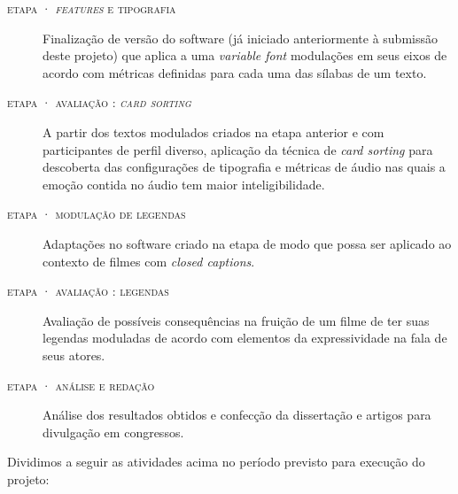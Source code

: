 \documentclass[a4paper,11pt,titlepage,singlespacing]{article}
\newcommand{\etapa}[1]{\textsc{etapa \oldstylenums{#1}}}
\begin{document}
\begin{description}
\item[\textsc{\etapa{1} ·  \textsl{features} e tipografia}] 
Finalização de versão do software (já iniciado anteriormente à submissão deste projeto) que aplica a uma \textit{variable font} modulações em seus eixos de acordo com métricas definidas para cada uma das sílabas de um texto.

\item[\textsc{\etapa{2} ·  avaliação : \textit{card sorting}}] 
A partir dos textos modulados criados na etapa anterior e com participantes de perfil diverso, aplicação da técnica de \textit{card sorting} para descoberta das configurações de tipografia e métricas de áudio nas quais a emoção contida no áudio tem maior inteligibilidade.

\item[\textsc{\etapa{3} ·  modulação de legendas}]
Adaptações no software criado na etapa  de modo que possa ser aplicado ao contexto de filmes com \textit{closed captions}.

\item[\textsc{\etapa{4} ·  avaliação : legendas}]
Avaliação de possíveis consequências na fruição de um filme de ter suas legendas moduladas de acordo com elementos da expressividade na fala de seus atores.

\item[\textsc{\etapa{5} ·  análise e redação}]
Análise dos resultados obtidos e confecção da dissertação e artigos para divulgação em congressos.

\end{description}

Dividimos a seguir as atividades acima no período previsto para execução do projeto:
\end{document}
